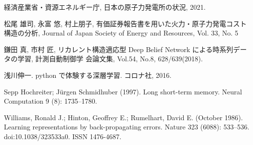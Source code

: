 \begin{thebibliography}{99}

経済産業省・資源エネルギー庁, 日本の原子力発電所の状況, 2021.

松尾 雄司, 永富 悠, 村上朋子, 有価証券報告書を用いた火力・原子力発電コスト構造の分析, Journal of Japan Society of Energy and Resources, Vol. 33, No. 5

鎌田 真, 市村 匠, リカレント構造適応型 Deep Belief Network による時系列データの学習, 計測自動制御学 会論文集, Vol.54, No.8, 628/639(2018).

浅川伸一. python で体験する深層学習. コロナ社, 2016.

Sepp Hochreiter; Jürgen Schmidhuber (1997). Long short-term memory. Neural Computation 9 (8): 1735–1780.

Williams, Ronald J.; Hinton, Geoffrey E.; Rumelhart, David E. (October 1986). Learning representations by back-propagating errors. Nature 323 (6088): 533–536. doi:10.1038/323533a0. ISSN 1476-4687.

\end{thebibliography}


